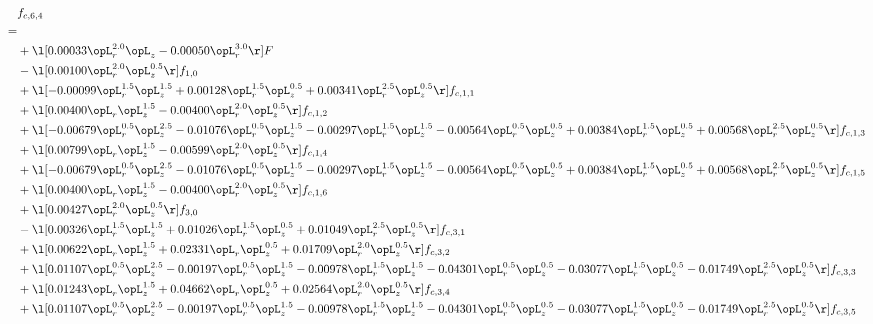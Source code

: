 \begin{alignat}{2} 
\label{eq:f_64_1} 
& f_{c,6,4} \nonumber \\ 
 = \\ 
& + \l[  0.00033 \opL_r^{2.0} \opL_z   -0.00050 \opL_r^{3.0}  \r] F \nonumber \\ 
& - \l[  0.00100 \opL_r^{2.0} \opL_z^{0.5}  \r] f_{1,0} \nonumber \\ 
& + \l[  -0.00099 \opL_r^{1.5} \opL_z^{1.5} +  0.00128 \opL_r^{1.5} \opL_z^{0.5} +  0.00341 \opL_r^{2.5} \opL_z^{0.5}  \r] f_{c,1,1} \nonumber \\ 
& + \l[  0.00400 \opL_r \opL_z^{1.5}   -0.00400 \opL_r^{2.0} \opL_z^{0.5}  \r] f_{c,1,2} \nonumber \\ 
& + \l[  -0.00679 \opL_r^{0.5} \opL_z^{2.5}   -0.01076 \opL_r^{0.5} \opL_z^{1.5}   -0.00297 \opL_r^{1.5} \opL_z^{1.5}   -0.00564 \opL_r^{0.5} \opL_z^{0.5} +  0.00384 \opL_r^{1.5} \opL_z^{0.5} +  0.00568 \opL_r^{2.5} \opL_z^{0.5}  \r] f_{c,1,3} \nonumber \\ 
& + \l[  0.00799 \opL_r \opL_z^{1.5}   -0.00599 \opL_r^{2.0} \opL_z^{0.5}  \r] f_{c,1,4} \nonumber \\ 
& + \l[  -0.00679 \opL_r^{0.5} \opL_z^{2.5}   -0.01076 \opL_r^{0.5} \opL_z^{1.5}   -0.00297 \opL_r^{1.5} \opL_z^{1.5}   -0.00564 \opL_r^{0.5} \opL_z^{0.5} +  0.00384 \opL_r^{1.5} \opL_z^{0.5} +  0.00568 \opL_r^{2.5} \opL_z^{0.5}  \r] f_{c,1,5} \nonumber \\ 
& + \l[  0.00400 \opL_r \opL_z^{1.5}   -0.00400 \opL_r^{2.0} \opL_z^{0.5}  \r] f_{c,1,6} \nonumber \\ 
& + \l[  0.00427 \opL_r^{2.0} \opL_z^{0.5}  \r] f_{3,0} \nonumber \\ 
& - \l[  0.00326 \opL_r^{1.5} \opL_z^{1.5} +  0.01026 \opL_r^{1.5} \opL_z^{0.5} +  0.01049 \opL_r^{2.5} \opL_z^{0.5}  \r] f_{c,3,1} \nonumber \\ 
& + \l[  0.00622 \opL_r \opL_z^{1.5} +  0.02331 \opL_r \opL_z^{0.5} +  0.01709 \opL_r^{2.0} \opL_z^{0.5}  \r] f_{c,3,2} \nonumber \\ 
& + \l[  0.01107 \opL_r^{0.5} \opL_z^{2.5}   -0.00197 \opL_r^{0.5} \opL_z^{1.5}   -0.00978 \opL_r^{1.5} \opL_z^{1.5}   -0.04301 \opL_r^{0.5} \opL_z^{0.5}   -0.03077 \opL_r^{1.5} \opL_z^{0.5}   -0.01749 \opL_r^{2.5} \opL_z^{0.5}  \r] f_{c,3,3} \nonumber \\ 
& + \l[  0.01243 \opL_r \opL_z^{1.5} +  0.04662 \opL_r \opL_z^{0.5} +  0.02564 \opL_r^{2.0} \opL_z^{0.5}  \r] f_{c,3,4} \nonumber \\ 
& + \l[  0.01107 \opL_r^{0.5} \opL_z^{2.5}   -0.00197 \opL_r^{0.5} \opL_z^{1.5}   -0.00978 \opL_r^{1.5} \opL_z^{1.5}   -0.04301 \opL_r^{0.5} \opL_z^{0.5}   -0.03077 \opL_r^{1.5} \opL_z^{0.5}   -0.01749 \opL_r^{2.5} \opL_z^{0.5}  \r] f_{c,3,5} \nonumber \\ 

\end{alignat}
